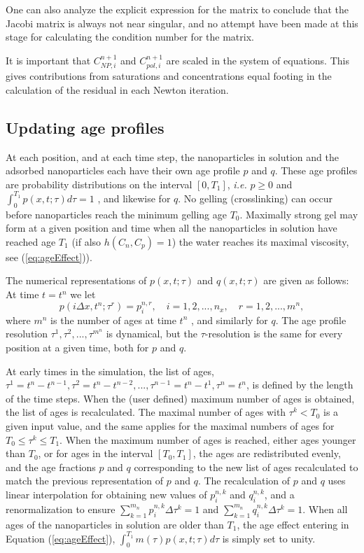 \documentclass[nanomaterials,article,submit,moreauthors,pdftex]{Definitions/mdpi}
\begin{document}
One can also analyze the explicit expression for the matrix to conclude that the Jacobi matrix is always not near singular, and no attempt have been made at this stage for calculating the condition number for the matrix.

It is important that  $C^{n+1}_{\textit{NP}, i}$ and $C^{n+1}_{pol, i}$ are scaled in the system of equations. This gives contributions from saturations and concentrations equal footing in the calculation of the residual in each Newton iteration.

\subsection{Updating age profiles}
At each position, and at each time step, the nanoparticles in solution and the adsorbed nanoparticles each have their own age profile $p$ and $q$. These age profiles are probability distributions on the interval $[0,T_1]$, \textit{i.e.} $p\geq0$  and $\int^{T_1}_0 p(x,t;\tau)d\tau=1$  , and likewise for  $q$. No gelling (crosslinking) can occur before nanoparticles reach the minimum gelling age  $T_0$. Maximally strong gel may form at a given position and time when all the nanoparticles in solution have reached age $T_1$ (if also $h(C_n,C_p)=1$) the water reaches its maximal viscosity, see (\ref{eq:ageEffect})).

The numerical representations of $p(x,t;\tau)$ and $q(x,t;\tau)$ are given as follows: At time $t=t^n$ we let
\begin{equation}
    p(i\Delta x,t^n;\tau^r)=p^{n,r}_i, \quad i=1,2,...,n_x, \quad r=1,2,...,m^n,
\end{equation}
where $m^n$ is the number of ages at time $t^n$ , and similarly for $q$. The age profile resolution $\tau^1,\tau^2,...,\tau^{m^n}$ is dynamical, but the  $\tau$-resolution is the same for every position at a given time, both for $p$ and $q$.

At early times in the simulation, the list of ages, $\tau^1=t^n-t^{n-1},\tau^2=t^n-t^{n-2},...,\tau^{n-1}=t^n-t^1, \tau^{n}=t^n$, is defined by the length of the time steps. When the (user defined) maximum number of ages is obtained, the list of ages is recalculated. The maximal number of ages with $\tau^k<T_0$  is a given input value, and the same applies for the maximal numbers of ages for  $T_0\leq\tau^k\leq T_1$. When the maximum number of ages is reached, either ages younger than  $T_0$, or for ages in the interval $[T_0,T_1]$, the ages are redistributed evenly, and the age fractions $p$ and $q$ corresponding to the new list of ages recalculated to match the previous representation of $p$ and $q$. The recalculation of $p$ and $q$ uses linear interpolation for obtaining new values of  $p^{n,k}_i$ and $q^{n,k}_i$, and a renormalization to ensure $\sum^{m_n}_{k=1} p_i^{n,k}\Delta\tau^k=1$  and  $\sum^{m_n}_{k=1} q_i^{n,k}\Delta\tau^k=1$. When all ages of the nanoparticles in solution are older than $T_1$, the age effect entering in Equation (\ref{eq:ageEffect}), $\int^{T_1}_{0} m(\tau)p(x,t;\tau)d\tau$ is simply set to unity.
\end{document}
